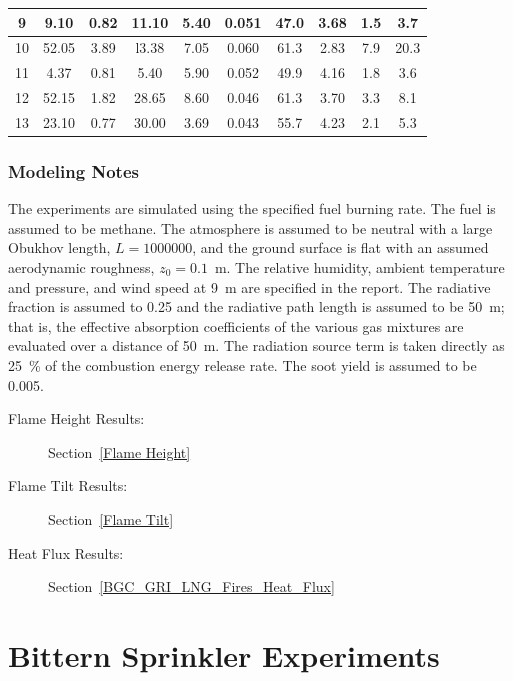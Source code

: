 \begin{table}[!ht]
\begin{tabular}{|c|c|c|c|c|c|c|c|c|c|}
9     & 9.10       & 0.82      & 11.10   & 5.40        & 0.051             & 47.0        & 3.68        & 1.5         & 3.7         \\ \hline
10    & 52.05      & 3.89      & l3.38   & 7.05        & 0.060             & 61.3        & 2.83        & 7.9         & 20.3        \\ \hline
11    & 4.37       & 0.81      & 5.40    & 5.90        & 0.052             & 49.9        & 4.16        & 1.8         & 3.6         \\ \hline
12    & 52.15      & 1.82      & 28.65   & 8.60        & 0.046             & 61.3        & 3.70        & 3.3         & 8.1         \\ \hline
13    & 23.10      & 0.77      & 30.00   & 3.69        & 0.043             & 55.7        & 4.23        & 2.1         & 5.3         \\ \hline
\end{tabular}
\end{table}

\subsubsection{Modeling Notes}

The experiments are simulated using the specified fuel burning rate. The fuel is assumed to be methane. The atmosphere is assumed to be neutral with a large Obukhov length, $L=1000000$, and the ground surface is flat with an assumed aerodynamic roughness, $z_0=0.1$~m. The relative humidity, ambient temperature and pressure, and wind speed at 9~m are specified in the report. The radiative fraction is assumed to 0.25 and the radiative path length is assumed to be 50~m; that is, the effective absorption coefficients of the various gas mixtures are evaluated over a distance of 50~m. The radiation source term is taken directly as 25~\% of the combustion energy release rate. The soot yield is assumed to be 0.005.

\begin{description}
\item[Flame Height Results:] Section~\ref{Flame Height} 
\item[Flame Tilt Results:] Section~\ref{Flame Tilt} 
\item[Heat Flux Results:] Section~\ref{BGC_GRI_LNG_Fires_Heat_Flux} 
\end{description}

\FloatBarrier


\section{Bittern Sprinkler Experiments}
\label{Bittern_Sprinkler_Description}


